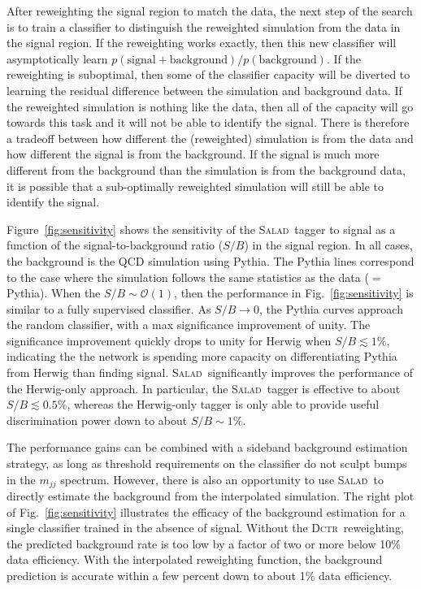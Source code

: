 \documentclass[a4paper,11pt]{article}
\begin{document}
After reweighting the signal region to match the data, the next step of the search is to train a classifier to distinguish the reweighted simulation from the data in the signal region.  If the reweighting works exactly, then this new classifier will asymptotically learn $p(\text{signal}+\text{background})/p(\text{background})$.  If the reweighting is suboptimal, then some of the classifier capacity will be diverted to learning the residual difference between the simulation and background data.  If the reweighted simulation is nothing like the data, then all of the capacity will go towards this task and it will not be able to identify the signal.  There is therefore a tradeoff between how different the (reweighted) simulation is from the data and how different the signal is from the background.  If the signal is much more different from the background than the simulation is from the background data, it is possible that a sub-optimally reweighted simulation will still be able to identify the signal.

Figure~\ref{fig:sensitivity} shows the sensitivity of the \textsc{Salad}~tagger to signal as a function of the signal-to-background ratio ($S/B$) in the signal region.  In all cases, the background is the QCD simulation using Pythia.  The Pythia lines correspond to the case where the simulation follows the same statistics as the data ($=$ Pythia).  When the $S/B\sim\mathcal{O}(1)$, then the performance in Fig.~\ref{fig:sensitivity} is similar to a fully supervised classifier.  As $S/B\rightarrow 0$, the Pythia curves approach the random classifier, with a max significance improvement of unity.  The significance improvement quickly drops to unity for Herwig when $S/B\lesssim 1\%$, indicating the the network is spending more capacity on differentiating Pythia from Herwig than finding signal.   \textsc{Salad}~significantly improves the performance of the Herwig-only approach.  In particular, the \textsc{Salad}~tagger is effective to about $S/B\lesssim 0.5\%$, whereas the Herwig-only tagger is only able to provide useful discrimination power down to about $S/B\sim 1\%$.   

The performance gains can be combined with a sideband background estimation strategy, as long as threshold requirements on the classifier do not sculpt bumps in the $m_{jj}$ spectrum.  However, there is also an opportunity to use \textsc{Salad}~to directly estimate the background from the interpolated simulation.  The right plot of Fig.~\ref{fig:sensitivity} illustrates the efficacy of the background estimation for a single classifier trained in the absence of signal.  Without the \textsc{Dctr}~reweighting, the predicted background rate is too low by a factor of two or more below 10\% data efficiency.  With the interpolated reweighting function, the background prediction is accurate within a few percent down to about 1\% data efficiency.
\end{document}
